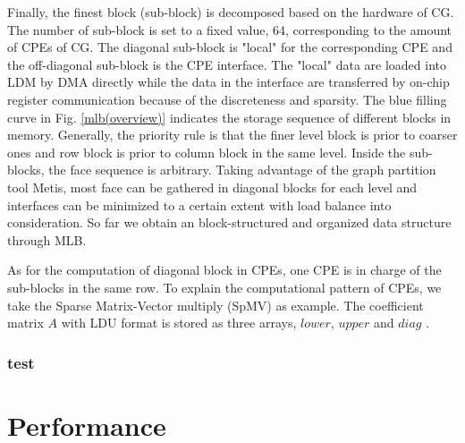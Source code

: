 \documentclass[conference]{IEEEtran}
\begin{document}
Finally, the finest block (sub-block) is decomposed based on the hardware of CG. The number of sub-block is set to a fixed value, 64, corresponding to the amount of CPEs of CG. The diagonal sub-block is "local" for the corresponding CPE and the off-diagonal sub-block is the CPE interface. The "local" data are loaded into LDM by DMA directly while the data in the interface are transferred by on-chip register communication because of the discreteness and sparsity. The blue filling curve in Fig. \ref{mlb(overview)} indicates the storage sequence of different blocks in memory. Generally, the priority rule is that the finer level block is prior to coarser ones and row block is prior to column block in the same level. Inside the sub-blocks, the face sequence is arbitrary. Taking advantage of the graph partition tool Metis, most face can be gathered in diagonal blocks for each level and interfaces can be minimized to a certain extent with load balance into consideration. So far we obtain an block-structured and organized data structure through MLB.

As for the computation of diagonal block in CPEs, one CPE is in charge of the sub-blocks in the same row. To explain the computational pattern of CPEs, we take the Sparse Matrix-Vector multiply (SpMV) as example. The coefficient matrix $A$ with LDU format is stored as three arrays, $lower$, $upper$ and $diag$ .

\subsubsection{test}

\section{Performance}
\end{document}
